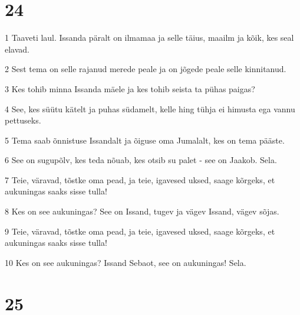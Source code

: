\chapter{24}

\par 1 Taaveti laul. Issanda päralt on ilmamaa ja selle täius, maailm ja kõik, kes seal elavad.
\par 2 Sest tema on selle rajanud merede peale ja on jõgede peale selle kinnitanud.
\par 3 Kes tohib minna Issanda mäele ja kes tohib seista ta pühas paigas?
\par 4 See, kes süütu kätelt ja puhas südamelt, kelle hing tühja ei himusta ega vannu pettuseks.
\par 5 Tema saab õnnistuse Issandalt ja õiguse oma Jumalalt, kes on tema pääste.
\par 6 See on sugupõlv, kes teda nõuab, kes otsib su palet - see on Jaakob. Sela.
\par 7 Teie, väravad, tõstke oma pead, ja teie, igavesed uksed, saage kõrgeks, et aukuningas saaks sisse tulla!
\par 8 Kes on see aukuningas? See on Issand, tugev ja vägev Issand, vägev sõjas.
\par 9 Teie, väravad, tõstke oma pead, ja teie, igavesed uksed, saage kõrgeks, et aukuningas saaks sisse tulla!
\par 10 Kes on see aukuningas? Issand Sebaot, see on aukuningas! Sela.

\chapter{25}


